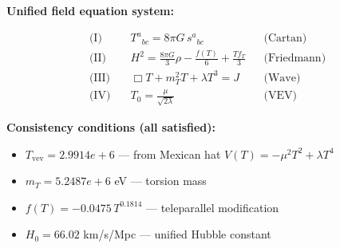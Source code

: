 
\textbf{Unified field equation system:}

\begin{align}
  \text{(I)} \quad & T^a{}_{bc} = 8\pi G \, s^a{}_{bc} && \text{(Cartan)} \\
  \text{(II)} \quad & H^2 = \frac{8\pi G}{3}\rho - \frac{f(T)}{6} + \frac{Tf_T}{3} && \text{(Friedmann)} \\
  \text{(III)} \quad & \Box T + m_T^2 T + \lambda T^3 = J && \text{(Wave)} \\
  \text{(IV)} \quad & T_0 = \frac{\mu}{\sqrt{2\lambda}} && \text{(VEV)}
\end{align}

\textbf{Consistency conditions (all satisfied):}
\begin{itemize}
  \item $T_{\text{vev}} = 2.9914e+6$ — from Mexican hat $V(T) = -\mu^2 T^2 + \lambda T^4$
  \item $m_T = 5.2487e+6$ eV — torsion mass
  \item $f(T) = -0.0475 \, T^{0.1814}$ — teleparallel modification
  \item $H_0 = 66.02$ km/s/Mpc — unified Hubble constant
\end{itemize}